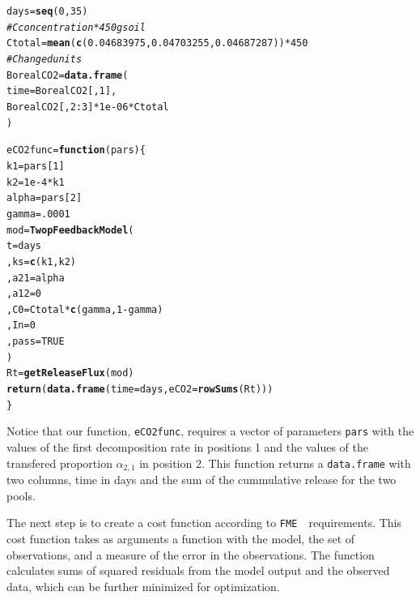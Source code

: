 \documentclass[a4paper]{article}\usepackage[]{graphicx}\usepackage[]{color}
\makeatletter
\newcommand{\hlnum}[1]{\textcolor[rgb]{0.686,0.059,0.569}{#1}}%
\newcommand{\hlcom}[1]{\textcolor[rgb]{0.678,0.584,0.686}{\textit{#1}}}%
\newcommand{\hlopt}[1]{\textcolor[rgb]{0,0,0}{#1}}%
\newcommand{\hlstd}[1]{\textcolor[rgb]{0.345,0.345,0.345}{#1}}%
\newcommand{\hlkwa}[1]{\textcolor[rgb]{0.161,0.373,0.58}{\textbf{#1}}}%
\newcommand{\hlkwb}[1]{\textcolor[rgb]{0.69,0.353,0.396}{#1}}%
\newcommand{\hlkwc}[1]{\textcolor[rgb]{0.333,0.667,0.333}{#1}}%
\newcommand{\hlkwd}[1]{\textcolor[rgb]{0.737,0.353,0.396}{\textbf{#1}}}%
\newenvironment{kframe}{%
 \def\at@end@of@kframe{}%
 \ifinner\ifhmode%
  \def\at@end@of@kframe{\end{minipage}}%
  \begin{minipage}{\columnwidth}%
 \fi\fi%
 \def\FrameCommand##1{\hskip\@totalleftmargin \hskip-\fboxsep
 \colorbox{shadecolor}{##1}\hskip-\fboxsep
     \hskip-\linewidth \hskip-\@totalleftmargin \hskip\columnwidth}%
 \MakeFramed {\advance\hsize-\width
   \@totalleftmargin\z@ \linewidth\hsize
   \@setminipage}}%
 {\par\unskip\endMakeFramed%
 \at@end@of@kframe}
\newenvironment{knitrout}{}{} %
\newcommand{\FME}{\texttt{FME }}
\makeatother
\begin{document}
\begin{knitrout}
\color{fgcolor}\begin{kframe}
\begin{alltt}
\hlstd{days}\hlkwb{=}\hlkwd{seq}\hlstd{(}\hlnum{0}\hlstd{,}\hlnum{35}\hlstd{)}
\hlcom{#C concentration * 450 g soil}
\hlstd{Ctotal}\hlkwb{=}\hlkwd{mean}\hlstd{(}\hlkwd{c}\hlstd{(}\hlnum{0.04683975}\hlstd{,} \hlnum{0.04703255}\hlstd{,} \hlnum{0.04687287}\hlstd{))}\hlopt{*}\hlnum{450}
\hlcom{#Changed units}
\hlstd{BorealCO2}\hlkwb{=}\hlkwd{data.frame}\hlstd{(}
  \hlkwc{time}\hlstd{=BorealCO2[,}\hlnum{1}\hlstd{],}
  \hlstd{BorealCO2[,}\hlnum{2}\hlopt{:}\hlnum{3}\hlstd{]}\hlopt{*}\hlnum{1e-06}\hlopt{*}\hlstd{Ctotal}
\hlstd{)}

\hlstd{eCO2func}\hlkwb{=}\hlkwa{function}\hlstd{(}\hlkwc{pars}\hlstd{)\{}
  \hlstd{k1}\hlkwb{=}\hlstd{pars[}\hlnum{1}\hlstd{]}
  \hlstd{k2}\hlkwb{=}\hlnum{1e-4}\hlopt{*}\hlstd{k1}
  \hlstd{alpha}\hlkwb{=}\hlstd{pars[}\hlnum{2}\hlstd{]}
  \hlstd{gamma}\hlkwb{=}\hlnum{.0001}
  \hlstd{mod}\hlkwb{=}\hlkwd{TwopFeedbackModel}\hlstd{(}
    \hlkwc{t}\hlstd{=days}
    \hlstd{,}\hlkwc{ks}\hlstd{=}\hlkwd{c}\hlstd{(k1,k2)}
    \hlstd{,}\hlkwc{a21}\hlstd{=alpha}
    \hlstd{,}\hlkwc{a12}\hlstd{=}\hlnum{0}
    \hlstd{,}\hlkwc{C0}\hlstd{=Ctotal}\hlopt{*}\hlkwd{c}\hlstd{(gamma,}\hlnum{1}\hlopt{-}\hlstd{gamma)}
    \hlstd{,}\hlkwc{In}\hlstd{=}\hlnum{0}
    \hlstd{,}\hlkwc{pass}\hlstd{=}\hlnum{TRUE}
  \hlstd{)}
  \hlstd{Rt}\hlkwb{=}\hlkwd{getReleaseFlux}\hlstd{(mod)}
  \hlkwd{return}\hlstd{(}\hlkwd{data.frame}\hlstd{(}\hlkwc{time}\hlstd{=days,}\hlkwc{eCO2}\hlstd{=}\hlkwd{rowSums}\hlstd{(Rt)))}
\hlstd{\}}
\end{alltt}
\end{kframe}
\end{knitrout}

Notice that our function, {\tt eCO2func}, requires a vector of parameters {\tt pars} with the values of the first decomposition rate in positions 1 and the values of the transfered proportion $\alpha_{2,1}$ in position 2. This function returns a {\tt data.frame} with two columns, time in days and the sum of the cummulative release for the two pools. 

The next step is to create a cost function according to \FME \, requirements. This cost function takes as arguments a function with the model, the set of observations, and a measure of the error in the observations. The function calculates sums of squared residuals from the model output and the observed data, which can be further minimized for optimization. 
\end{document}
